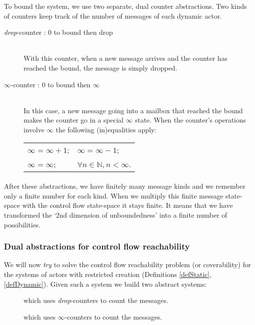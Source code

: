 \documentclass[a4paper]{report}
\numberwithin{algorithm}{chapter}
\begin{document}
To bound the system, we use two separate, dual counter abstractions.
Two kinds of counters keep track of the number of messages of each dynamic actor.
\begin{description}
\item[\emph{drop}-counter : 0 to bound then drop] \mbox{}\\
With this counter, when a new message arrives and the counter has reached the bound, the message is simply dropped.
\item[$\infty$-counter : 0 to bound then $\infty$] \mbox{}\\
In this case, a new message going into a mailbox that reached the bound makes the counter go in a special $\infty$ state.
When the counter's operations involve $\infty$ the following (in)equalities apply:\\
\begin{tabular}{ll}
$\infty = \infty + 1$; & $\infty = \infty -1$; \\
$\infty = \infty$; & $\forall n \in \mathbb{N}, n < \infty$.
\end{tabular}
\end{description}

\paragraph{}
After these abstractions, we have finitely many message kinds and we remember only a finite number for each kind.
When we multiply this finite message state-space with the control flow state-space it stays finite.
It means that we have transformed the `2nd dimension of unboundedness' into a finite  number of possibilities.

\subsubsection{Dual abstractions for control flow reachability}

We will now \emph{try} to solve the control flow reachability problem (or coverability) for the systems of actors with restricted creation (Definitions \ref{defStatic}, \ref{defDynamic}).
Given such a system we build two abstract systems:
\begin{description}
\item[\dabs{}] which uses \emph{drop}-counters to count the messages.
\item[\iabs{}] which uses $\infty$-counters to count the messages.
\end{description}
\end{document}
